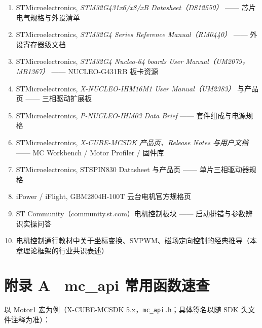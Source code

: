 \documentclass[
  UTF8,
  scheme=plain,
  fontsize=10pt,
  openany
]{ctexbook}
\begin{document}
\begin{enumerate}
\def\labelenumi{\arabic{enumi}.}
\tightlist
\item
  STMicroelectronics, \emph{STM32G431x6/x8/xB Datasheet（DS12550）}
  ------ 芯片电气规格与外设清单
\item
  STMicroelectronics, \emph{STM32G4 Series Reference Manual（RM0440）}
  ------ 外设寄存器级文档
\item
  STMicroelectronics, \emph{STM32G4 Nucleo-64 boards User
  Manual（UM2079，MB1367）} ------ NUCLEO-G431RB 板卡资源
\item
  STMicroelectronics, \emph{X-NUCLEO-IHM16M1 User Manual（UM2383）}
  与产品页 ------ 三相驱动扩展板
\item
  STMicroelectronics, \emph{P-NUCLEO-IHM03 Data Brief} ------
  套件组成与电源规格
\item
  STMicroelectronics, \emph{X-CUBE-MCSDK 产品页、Release Notes
  与用户文档} ------ MC Workbench / Motor Profiler / 固件库
\item
  STMicroelectronics, STSPIN830 Datasheet 与产品页 ------
  单片三相驱动器规格
\item
  iPower / iFlight, GBM2804H-100T 云台电机官方规格页
\item
  ST Community（community.st.com）电机控制板块 ------
  启动排错与参数辨识实操问答
\item
  电机控制通行教材中关于坐标变换、SVPWM、磁场定向控制的经典推导（本章理论框架的行业共识表述）
\end{enumerate}

\section*{附录 A　mc\_api
常用函数速查}\label{ux9644ux5f55-a-mc_api-ux5e38ux7528ux51fdux6570ux901fux67e5}

以 Motor1 宏为例（X-CUBE-MCSDK 5.x，\texttt{mc\_api.h}；具体签名以随 SDK
头文件注释为准）：
\end{document}

